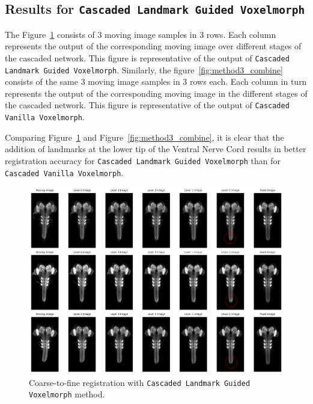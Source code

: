 \documentclass{book}
\begin{document}
	\subsection{Results for \texttt{Cascaded Landmark Guided Voxelmorph}}
	The Figure~\ref{fig:method4_combine} consists of 3 moving image samples in 3 rows. Each column represents the output of the corresponding moving image over different stages of the cascaded network. This figure is representative of the output of \texttt{Cascaded Landmark Guided Voxelmorph}. Similarly, the figure~\ref{fig:method3_combine} consists of the same 3 moving image samples in 3 rows each. Each column in turn represents the output of the corresponding moving image in the different stages of the cascaded network. This figure is representative of the output of \texttt{Cascaded Vanilla Voxelmorph}.
	
	Comparing Figure~\ref{fig:method4_combine} and Figure~\ref{fig:method3_combine}, it is clear that the addition of landmarks at the lower tip of the Ventral Nerve Cord results in better registration accuracy for \texttt{Cascaded Landmark Guided Voxelmorph} than for \texttt{Cascaded Vanilla Voxelmorph}.
	
	\begin{figure}[h!]
		\centering
		\includegraphics[width=\columnwidth]{resources/chapter4/method4/ldm/registered_images.png}
		\caption{Coarse-to-fine registration with \texttt{Cascaded Landmark Guided Voxelmorph} method.}
		\label{fig:method4_combine}
	\end{figure}
	
\end{document}
